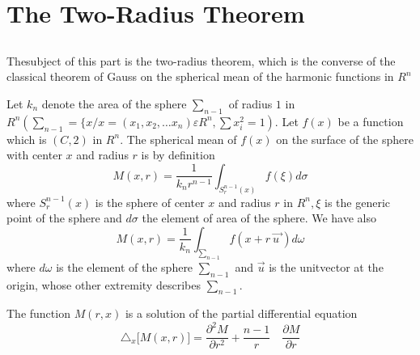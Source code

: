 \part{The Two-Radius Theorem}\label{part3}



\setcounter{chapter}{0}
\chapter{}\label{part3:chap1}

\section{}\label{part3:chap1:sec1}

The\pageoriginale subject of this part is the two-radius theorem, which is the
converse of the classical theorem of Gauss on the spherical mean of
the harmonic functions in $R^n$ 

Let $k_n$ denote the area of the sphere $\sum_{n-1}$ of radius $1$ in
$R^n (\sum_{n-1} = \{x / x = (x_1,x_2,\ldots x_n) \varepsilon R^n, \sum
x^2_i = 1)$. Let $f(x)$ be a function which is $(C,2)$ in $R^n$. The
spherical mean of $f (x)$ on the surface of the sphere with center $x$
and radius $r$ is by definition  
\begin{equation}
  M(x,r) = \frac{1}{k_n r^{n-1}} \int_{S^{n-1} _r (x)} f (\xi) d
  \sigma \tag{1}\label{part3:chap1:sec1:eq1} 
\end{equation}
where $S_r^{n-1} (x)$ is the sphere of center $x$ and radius $r$ in
$R^n, \xi$ is the generic point of the sphere and $d \sigma$ the
element of area of the sphere. We have also   
\begin{equation}
  M (x,r) = \frac{1}{k_n} \int_{\sum_{n-1}} f (x+r ~\overrightarrow{u~})
  d \omega \tag{2}\label{part3:chap1:sec1:eq2} 
\end{equation}
where $d \omega$ is the element of the sphere $\sum_{n-1}$ and
$\overrightarrow{u}$ is the unit\pageoriginale vector at the origin, whose other
extremity describes $\sum_{n-1}$. 

\setcounter{proposition}{0}
\begin{proposition}[Poisson]\label{part3:chap1:sec1:prop1} 
  The function $M (r,x)$ is a solution of the partial differential
  equation 
  \begin{equation}
    \triangle_x \big[M (x,r)\big] = \frac{\partial^2 M} {\partial r^2} +
    \frac{n-1}{r} \quad \frac{\partial M} {\partial r}
    \tag{3}\label{part3:chap1:sec1:eq3}  
  \end{equation}
\end{proposition}

